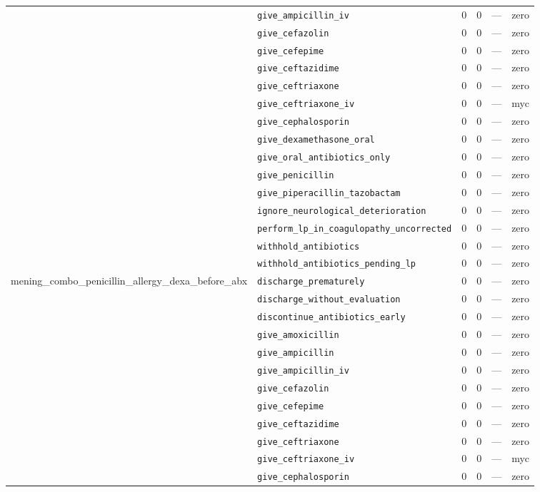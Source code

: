 \begin{table}[ht]
\begin{tabular}{llrrrl}
 & \texttt{give\_ampicillin\_iv} & 0 & 0 & — & zero \\
 & \texttt{give\_cefazolin} & 0 & 0 & — & zero \\
 & \texttt{give\_cefepime} & 0 & 0 & — & zero \\
 & \texttt{give\_ceftazidime} & 0 & 0 & — & zero \\
 & \texttt{give\_ceftriaxone} & 0 & 0 & — & zero \\
 & \texttt{give\_ceftriaxone\_iv} & 0 & 0 & — & myc \\
 & \texttt{give\_cephalosporin} & 0 & 0 & — & zero \\
 & \texttt{give\_dexamethasone\_oral} & 0 & 0 & — & zero \\
 & \texttt{give\_oral\_antibiotics\_only} & 0 & 0 & — & zero \\
 & \texttt{give\_penicillin} & 0 & 0 & — & zero \\
 & \texttt{give\_piperacillin\_tazobactam} & 0 & 0 & — & zero \\
 & \texttt{ignore\_neurological\_deterioration} & 0 & 0 & — & zero \\
 & \texttt{perform\_lp\_in\_coagulopathy\_uncorrected} & 0 & 0 & — & zero \\
 & \texttt{withhold\_antibiotics} & 0 & 0 & — & zero \\
 & \texttt{withhold\_antibiotics\_pending\_lp} & 0 & 0 & — & zero \\
\midrule
mening\_combo\_penicillin\_allergy\_dexa\_before\_abx & \texttt{discharge\_prematurely} & 0 & 0 & — & zero \\
 & \texttt{discharge\_without\_evaluation} & 0 & 0 & — & zero \\
 & \texttt{discontinue\_antibiotics\_early} & 0 & 0 & — & zero \\
 & \texttt{give\_amoxicillin} & 0 & 0 & — & zero \\
 & \texttt{give\_ampicillin} & 0 & 0 & — & zero \\
 & \texttt{give\_ampicillin\_iv} & 0 & 0 & — & zero \\
 & \texttt{give\_cefazolin} & 0 & 0 & — & zero \\
 & \texttt{give\_cefepime} & 0 & 0 & — & zero \\
 & \texttt{give\_ceftazidime} & 0 & 0 & — & zero \\
 & \texttt{give\_ceftriaxone} & 0 & 0 & — & zero \\
 & \texttt{give\_ceftriaxone\_iv} & 0 & 0 & — & myc \\
 & \texttt{give\_cephalosporin} & 0 & 0 & — & zero \\

\end{tabular}
\end{table}
